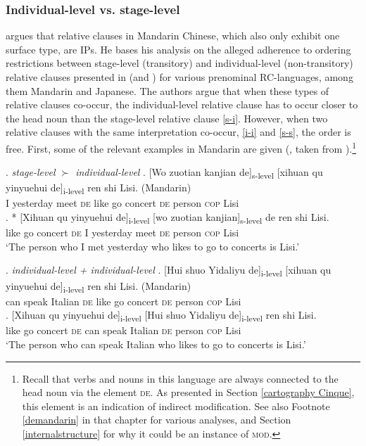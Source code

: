 \subsubsection{Individual-level vs. stage-level}

\citet[§ 3.6]{cinque:2020:relcl} argues that relative clauses in  Mandarin Chinese, which also only exhibit one surface type, are IPs. He bases his analysis on the alleged adherence to ordering restrictions between stage-level (transitory) and individual-level (non-transitory) relative clauses presented in \citet{larson:2004:order} (and \citealt{gobbo:2005:chinese}) for various prenominal RC-languages, among them Mandarin and Japanese. The authors argue that when these types of relative clauses co-occur, the individual-level relative clause has to occur closer to the head noun than the stage-level relative clause \ref{s-i}. However, when two relative clauses with the same interpretation co-occur, \ref{i-i} and \ref{s-s}, the order is free. First, some of the relevant examples in Mandarin are given (\citealt[104]{larson:2004:order}, taken from \citealt[298]{gobbo:2005:chinese}).\footnote{Recall that verbs and nouns in this language are always connected to the head noun via the element \textsc{de}. As presented in Section \ref{cartography Cinque}, this element is an indication of indirect modification. See also Footnote \ref{demandarin} in that chapter for various analyses, and Section \ref{internalstructure} for why it could be an instance of \textsc{mod}.}

\largerpage[2]
\ex. \label{ex1} \emph{stage-level $\succ$ individual-level} \label{s-i}
\ag. [Wo zuotian kanjian de]\textsubscript{s-level} [xihuan qu yinyuehui de]\textsubscript{i-level} ren shi Lisi. (Mandarin)\\
I yesterday meet \textsc{de} like go concert \textsc{de} person \textsc{cop} Lisi\\
\bg. * [Xihuan qu yinyuehui de]\textsubscript{i-level} [wo zuotian kanjian]\textsubscript{s-level} de ren shi Lisi.\\
like go concert \textsc{de} I yesterday meet \textsc{de} person \textsc{cop} Lisi\\
`The person who I met yesterday who likes to go to concerts is Lisi.'

\ex. \label{ex2} \emph{individual-level + individual-level} \label{i-i}
\ag. [Hui shuo Yidaliyu de]\textsubscript{i-level} [xihuan qu yinyuehui de]\textsubscript{i-level} ren shi Lisi. (Mandarin)\\
can speak Italian \textsc{de} like go concert \textsc{de} person \textsc{cop} Lisi\\
\bg. [Xihuan qu yinyuehui de]\textsubscript{i-level} [Hui shuo Yidaliyu de]\textsubscript{i-level} ren shi Lisi.\\
like go concert \textsc{de} can speak Italian \textsc{de} person \textsc{cop} Lisi\\
`The person who can speak Italian who likes to go to concerts is Lisi.'

